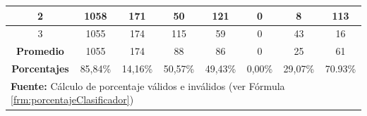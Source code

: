 \begin{table}[H]
\begin{center}
\begin{tabular}{|c|c|c|c|c|c|c|c|}
2                    & 1058                                                                  & 171                                                            & 50                                                                & 121                                                                   & 0                                              & 8                                              & 113                                            \\ \hline
3                    & 1055                                                                  & 174                                                            & 115                                                               & 59                                                                    & 0                                              & 43                                             & 16                                           \\ \hline
\textbf{Promedio}    & 1055                                                                  & 174                                                            & 88                                                                & 86                                                                    & 0                                              & 25                                             & 61                                            \\ \hline
\textbf{Porcentajes} & 85,84\%                                                               & 14,16\%                                                        & 50,57\%                                                           & 49,43\%                                                               & 0,00\%                                         & 29,07\%                                        & 70.93\%                                            \\ \hline
\multicolumn{8}{l}{\textbf{Fuente:} C\'alculo de porcentaje v\'alidos e inv\'alidos (ver F\'ormula \ref{frm:porcentajeClasificador})}
\end{tabular}
\end{center}
\end{table}
